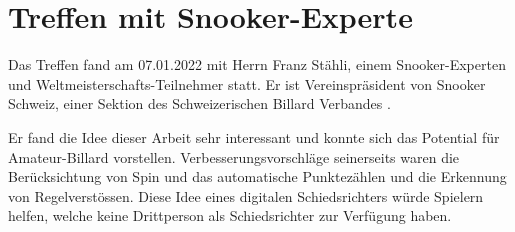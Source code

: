 \section{Treffen mit Snooker-Experte}\label{anhang:snooker-experte-treffen}
Das Treffen fand am 07.01.2022 mit Herrn Franz Stähli, einem Snooker-Experten und Weltmeisterschafts-Teilnehmer statt.
Er ist Vereinspräsident von Snooker Schweiz, einer Sektion des Schweizerischen Billard Verbandes \cite{snooker_ch}.

Er fand die Idee dieser Arbeit sehr interessant und konnte sich das Potential für Amateur-Billard vorstellen.
Verbesserungsvorschläge seinerseits waren die Berücksichtung von Spin und das automatische Punktezählen
und die Erkennung von Regelverstössen.
Diese Idee eines digitalen Schiedsrichters würde Spielern helfen, welche keine Drittperson als Schiedsrichter zur Verfügung haben.
